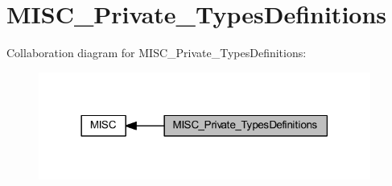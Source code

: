 \hypertarget{group___m_i_s_c___private___types_definitions}{}\section{M\+I\+S\+C\+\_\+\+Private\+\_\+\+Types\+Definitions}
\label{group___m_i_s_c___private___types_definitions}
Collaboration diagram for M\+I\+S\+C\+\_\+\+Private\+\_\+\+Types\+Definitions\+:
\nopagebreak
\begin{figure}[H]
\begin{center}
\leavevmode
\includegraphics[width=309pt]{group___m_i_s_c___private___types_definitions}
\end{center}
\end{figure}
